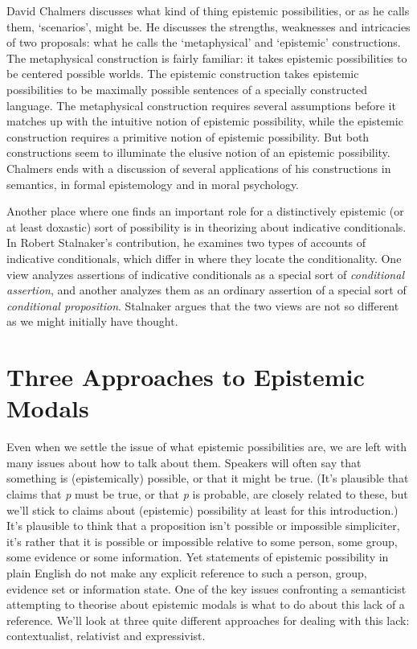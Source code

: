 \documentclass[
  11pt,
  letterpaper,
  DIV=11,
  numbers=noendperiod,
  twoside]{scrartcl}
\begin{document}
David Chalmers discusses what kind of thing epistemic possibilities, or
as he calls them, `scenarios', might be. He discusses the strengths,
weaknesses and intricacies of two proposals: what he calls the
`metaphysical' and `epistemic' constructions. The metaphysical
construction is fairly familiar: it takes epistemic possibilities to be
centered possible worlds. The epistemic construction takes epistemic
possibilities to be maximally possible sentences of a specially
constructed language. The metaphysical construction requires several
assumptions before it matches up with the intuitive notion of epistemic
possibility, while the epistemic construction requires a primitive
notion of epistemic possibility. But both constructions seem to
illuminate the elusive notion of an epistemic possibility. Chalmers ends
with a discussion of several applications of his constructions in
semantics, in formal epistemology and in moral psychology.

Another place where one finds an important role for a distinctively
epistemic (or at least doxastic) sort of possibility is in theorizing
about indicative conditionals. In Robert Stalnaker's contribution, he
examines two types of accounts of indicative conditionals, which differ
in where they locate the conditionality. One view analyzes assertions of
indicative conditionals as a special sort of \emph{conditional
assertion}, and another analyzes them as an ordinary assertion of a
special sort of \emph{conditional proposition}. Stalnaker argues that
the two views are not so different as we might initially have thought.

\section{Three Approaches to Epistemic
Modals}\label{three-approaches-to-epistemic-modals}

Even when we settle the issue of what epistemic possibilities are, we
are left with many issues about how to talk about them. Speakers will
often say that something is (epistemically) possible, or that it might
be true. (It's plausible that claims that \emph{p} must be true, or that
\emph{p} is probable, are closely related to these, but we'll stick to
claims about (epistemic) possibility at least for this introduction.)
It's plausible to think that a proposition isn't possible or impossible
simpliciter, it's rather that it is possible or impossible relative to
some person, some group, some evidence or some information. Yet
statements of epistemic possibility in plain English do not make any
explicit reference to such a person, group, evidence set or information
state. One of the key issues confronting a semanticist attempting to
theorise about epistemic modals is what to do about this lack of a
reference. We'll look at three quite different approaches for dealing
with this lack: contextualist, relativist and expressivist.
\end{document}
